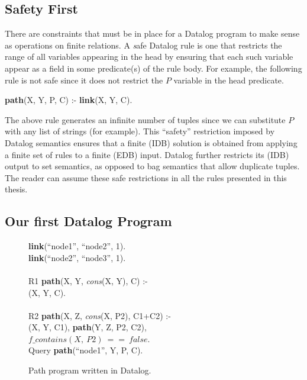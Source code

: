 \subsection{Safety First}

There are constraints that must be in place for a Datalog program to make sense
as operations on finite relations.  A {\emph safe} Datalog rule is one that
restricts the range of all variables appearing in the head by ensuring that
each such variable appear as a field in some predicate(s) of the rule body.
For example, the following rule is not safe since it does not restrict the $P$
variable in the  head predicate.

\begin{minipage}{\linewidth}
\ssp
{\bf path}(X, Y, P, C) :- {\bf link}(X, Y, C). \\
\end{minipage}
The above rule generates an infinite number of  tuples since we can
substitute $P$ with any list of strings (for example).  This ``safety''
restriction imposed by Datalog semantics ensures that a finite (IDB) solution is
obtained from applying a finite set of rules to a finite (EDB) input.  Datalog
further restricts its (IDB) output to set semantics, as opposed to bag
semantics that allow duplicate tuples.  The reader can assume these safe restrictions
in all the rules presented in this thesis.

\subsection{Our first Datalog Program}

\begin{figure}
\ssp
\begin{boxedminipage}{\linewidth}
{\bf link}(``node1'', ``node2'', 1). \\
{\bf link}(``node2'', ``node3'', 1). \\
\\
R1 {\bf path}(X, Y, {\em cons}(X, Y), C) :- \\
(X, Y, C). \\
\\       
R2 {\bf path}(X, Z, {\em cons}(X, P2), C1+C2) :- \\
(X, Y, C1), {\bf path}(Y, Z, P2, C2), \\
\datalogspace $f\_contains(X,\ P2)\ ==\ false$. \\

Query {\bf path}(``node1'', Y, P, C).
\end{boxedminipage}
\caption{\label{ch:p2:fig:datalogPath}Path program written in Datalog.}
\end{figure}

